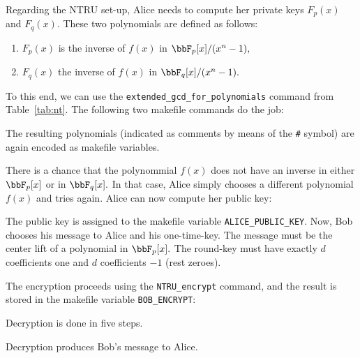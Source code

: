 Regarding the NTRU set-up, Alice needs to compute her private keys 
$F_p(x)$ and $F_q(x).$ These two polynomials are defined as follows:
\begin{enumerate}
\item
	$F_p(x)$ is the inverse of $f(x)$ in $\bbF_p[x]/(x^n-1),$ 
\item
$F_q(x)$ the inverse of $f(x)$ in $\bbF_q[x]/(x^n-1).$
\end{enumerate}
To this end, we can use the \verb'extended_gcd_for_polynomials' 
command from Table~\ref{tab:nt}.
The following two makefile commands do the job: 
{\tt

}
{\tt

}
{\tt

}
The resulting polynomials 
(indicated as comments by means of the  \verb'#' symbol) 
are again encoded as makefile variables. 
{\tt

}
There is a chance that the polynommial 
$f(x)$ does not have an inverse in either $\bbF_p[x]$ 
or in $\bbF_q[x].$ 
In that case, Alice simply chooses a different 
polynomial $f(x)$ and tries again.
Alice can now compute her public key:
{\tt

}
{\tt

}
The public key is assigned to the makefile variable \verb'ALICE_PUBLIC_KEY'.
Now, Bob chooses his message to Alice and his one-time-key. 
The message must be the center lift of a polynomial in $\bbF_p[x].$
The round-key must have exactly $d$ coefficients one 
and $d$ coefficients $-1$ (rest zeroes).
{\tt

}
{\tt

}
The encryption proceeds using the \verb'NTRU_encrypt' command, 
and the result is stored in the makefile variable \verb'BOB_ENCRYPT':
{\tt

}
{\tt

}
Decryption is done in five steps. 
{\tt

}
{\tt

}
{\tt

}
{\tt

}
{\tt

}
{\tt

}
{\tt

}
{\tt

}
{\tt

}
Decryption produces Bob's message to Alice.

